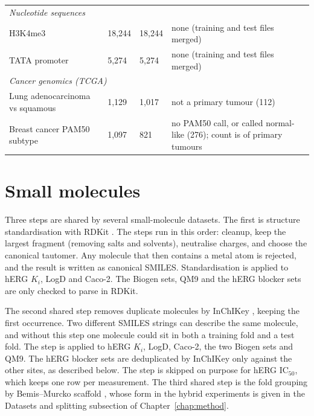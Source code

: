 \begin{table}[htbp]
\begin{tabular}{p{3.4cm}p{1.6cm}p{1.4cm}p{7.0cm}}
\midrule
\multicolumn{4}{l}{\textit{Nucleotide sequences}} \\
H3K4me3 & 18,244 & 18,244 & none (training and test files merged) \\
TATA promoter & 5,274 & 5,274 & none (training and test files merged) \\
\midrule
\multicolumn{4}{l}{\textit{Cancer genomics (TCGA)}} \\
Lung adenocarcinoma vs squamous & 1,129 & 1,017 & not a primary tumour (112) \\
Breast cancer PAM50 subtype & 1,097 & 821 & no PAM50 call, or called normal-like (276); count is of primary tumours \\
\bottomrule
\end{tabular}
\end{table}

\section{Small molecules}\label{app:datasets:smallmol}

Three steps are shared by several small-molecule datasets. The first is structure standardisation with RDKit \citep{rdkit}. The steps run in this order: cleanup, keep the largest fragment (removing salts and solvents), neutralise charges, and choose the canonical tautomer. Any molecule that then contains a metal atom is rejected, and the result is written as canonical SMILES. Standardisation is applied to hERG $K_i$, LogD and Caco-2. The Biogen sets, QM9 and the hERG blocker sets are only checked to parse in RDKit.

The second shared step removes duplicate molecules by InChIKey \citep{Heller2015}, keeping the first occurrence. Two different SMILES strings can describe the same molecule, and without this step one molecule could sit in both a training fold and a test fold. The step is applied to hERG $K_i$, LogD, Caco-2, the two Biogen sets and QM9. The hERG blocker sets are deduplicated by InChIKey only against the other sites, as described below. The step is skipped on purpose for hERG IC$_{50}$, which keeps one row per measurement. The third shared step is the fold grouping by Bemis--Murcko scaffold \citep{Bemis1996}, whose form in the hybrid experiments is given in the Datasets and splitting subsection of Chapter~\ref{chap:method}.

